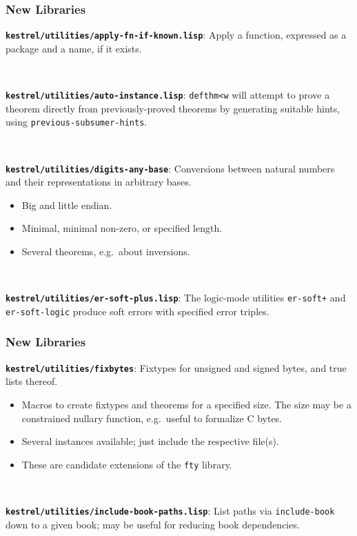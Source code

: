\documentclass{beamer}
\newcommand{\code}[1]{\texttt{#1}}
\newcommand{\bookpath}[1]{\textbf{\code{#1}}}
\newcommand{\newlibtitle}{\frametitle{New Libraries}}
\begin{document}

\begin{frame}

\newlibtitle

\bookpath{kestrel/utilities/apply-fn-if-known.lisp}:
Apply a function, expressed as a package and a name, if it exists.

\

\bookpath{kestrel/utilities/auto-instance.lisp}:
\code{defthm<w} will attempt to prove a theorem directly
from previously-proved theorems by generating
suitable hints, using \code{previous-subsumer-hints}.

\

\bookpath{kestrel/utilities/digits-any-base}:
Conversions between natural numbers
and their representations in arbitrary bases.
\begin{itemize}
\item
Big and little endian.
\item
Minimal, minimal non-zero, or specified length.
\item
Several theorems, e.g.\ about inversions.
\end{itemize}

\

\bookpath{kestrel/utilities/er-soft-plus.lisp}:
The logic-mode utilities \code{er-soft+} and \code{er-soft-logic} produce
soft errors with specified error triples.

\end{frame}


\begin{frame}

\newlibtitle

\bookpath{kestrel/utilities/fixbytes}:
Fixtypes for unsigned and signed bytes, and true lists thereof.
\begin{itemize}
\item
Macros to create fixtypes and theorems for a specified size.
The size may be a constrained nullary function,
e.g.\ useful to formalize C bytes.
\item
Several instances available; just include the respective file(s).
\item
These are candidate extensions of the \code{fty} library.
\end{itemize}

\

\bookpath{kestrel/utilities/include-book-paths.lisp}:
List paths via \code{include-book} down to a given book; may be useful
for reducing book dependencies.

\end{frame}
\end{document}
